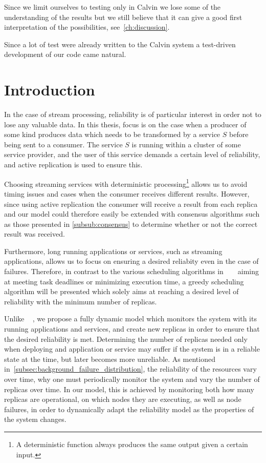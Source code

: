 \documentclass{cslthse-msc}
\begin{document}
Since we limit ourselves to testing only in Calvin we lose some of the understanding of the results but we still believe that it can give a good first interpretation of the possibilities, see~\cref{ch:discussion}. 

Since a lot of test were already written to the Calvin system a test-driven development of our code came natural.

\section{Introduction} \label{sec:design_intro}
In the case of stream processing, reliability is of particular interest in order not to lose any valuable data. In this thesis, focus is on the case when a producer of some kind produces data which needs to be transformed by a service $S$ before being sent to a consumer. The service $S$ is running within a cluster of some service provider, and the user of this service demands a certain level of reliability, and active replication is used to ensure this.	

Choosing streaming services with deterministic processing\footnote{A deterministic function always produces the same output given a certain input.} allows us to avoid timing issues and cases when the consumer receives different results. However, since using active replication the consumer will receive a result from each replica and our model could therefore easily be extended with consensus algorithms such as those presented in \cref{subsub:consensus} to determine whether or not the correct result was received. 

Furthermore, long running applications or services, such as streaming applications, allows us to focus on ensuring a desired reliabity even in the case of failures. Therefore, in contrast to the various scheduling algorithms in ~\cite{algoOptTimeMaxRel} \cite{optTaskAllocationForMaxRel} \cite{taskAllocation} \cite{taskAllocationSwarm} \cite{algoMaxRelEndToEndConstraint} \cite{algoMinExTime}~\cite{schedReplicas} aiming at meeting task deadlines or minimizing execution time, a greedy scheduling algorithm will be presented which solely aims at reaching a desired level of reliability with the minimum number of replicas.

Unlike ~\cite{designFaultTolerantSched}  \cite{evalReplicationSched} \cite{taskSchedulingReplication} \cite{effTaskReplMobGrid} \cite{relGridServicePredConstraint}, we propose a fully dynamic model which monitors the system with its running applications and services, and create new replicas in order to ensure that the desired reliability is met. Determining the number of replicas needed only when deploying and application or service may suffer if the system is in a reliable state at the time, but later becomes more unreliable. As mentioned in~\cref{subsec:background_failure_distribution}, the reliability of the resources vary over time, why one must periodically monitor the system and vary the number of replicas over time. In our model, this is achieved by monitoring both how many replicas are operational, on which nodes they are executing, as well as node failures, in order to dynamically adapt the reliability model as the properties of the system changes.
\end{document}
